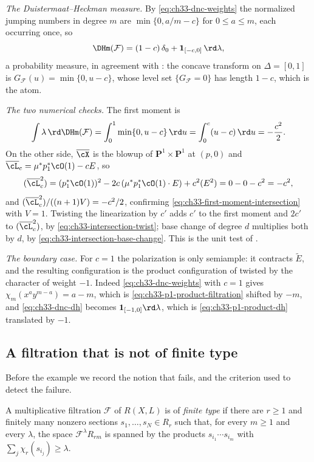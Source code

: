 \begin{example}
\emph{The Duistermaat--Heckman measure.}  By
\eqref{eq:ch33-dnc-weights} the normalized jumping numbers in degree $m$
are $\min\{0,a/m-c\}$ for $0\leq a\leq m$, each occurring once, so
\begin{equation}
\label{eq:ch33-dnc-dh}
 \DHm(\mathcal F)
 =(1-c)\,\delta_0+\mathbf 1_{[-c,0]}\,\rd\lambda ,
\end{equation}
a probability measure, in agreement with
: the concave transform on
$\Delta=[0,1]$ is $G_{\mathcal F}(u)=\min\{0,u-c\}$, whose level set
$\{G_{\mathcal F}=0\}$ has length $1-c$, which is the atom.

\emph{The two numerical checks.}  The first moment is
\[
 \int\lambda\,\rd\DHm(\mathcal F)
 =\int_0^1\min\{0,u-c\}\,\rd u
 =\int_0^c(u-c)\,\rd u=-\frac{c^2}{2}.
\]
On the other side, $\overline\cX$ is the blowup of
$\mathbf P^1\times\mathbf P^1$ at $(p,0)$ and
$\overline\cL_c=\mu^\ast p_1^\ast\cO(1)-cE$, so
\[
 (\overline\cL_c^2)
 =(p_1^\ast\cO(1))^2-2c\,(\mu^\ast p_1^\ast\cO(1)\cdot E)+c^2(E^2)
 =0-0-c^2=-c^2 ,
\]
and $(\overline\cL_c^2)/((n+1)V)=-c^2/2$, confirming
\eqref{eq:ch33-first-moment-intersection} with $V=1$.  Twisting the
linearization by $c'$ adds $c'$ to the first moment and
$2c'$ to $(\overline\cL_c^2)$, by
\eqref{eq:ch33-intersection-twist}; base change of degree $d$ multiplies
both by $d$, by \eqref{eq:ch33-intersection-base-change}.  This is the
unit test of .

\emph{The boundary case.}  For $c=1$ the polarization is only semiample:
it contracts $\widetilde E$, and the resulting configuration is the
product configuration of  twisted by the character of
weight $-1$.  Indeed \eqref{eq:ch33-dnc-weights} with $c=1$ gives
$\chi_m(x^ay^{m-a})=a-m$, which is
\eqref{eq:ch33-p1-product-filtration} shifted by $-m$, and
\eqref{eq:ch33-dnc-dh} becomes $\mathbf 1_{[-1,0]}\rd\lambda$, which is
\eqref{eq:ch33-p1-product-dh} translated by $-1$.
\end{example}

\subsection{A filtration that is not of finite type}
\label{sec:ch33-example-not-fg}

Before the example we record the notion that fails, and the criterion used
to detect the failure.

\begin{definition}
\label{def:ch33-finite-type}
A multiplicative filtration $\mathcal F$ of $R(X,L)$ is of
\emph{finite type} if there are $r\geq1$ and finitely many nonzero
sections $s_1,\dots,s_N\in R_r$ such that, for every $m\geq1$ and every
$\lambda$, the space $\mathcal F^\lambda R_{rm}$ is spanned by the
products $s_{i_1}\cdots s_{i_m}$ with
$\sum_{j}\chi_r(s_{i_j})\geq\lambda$.
\end{definition}

